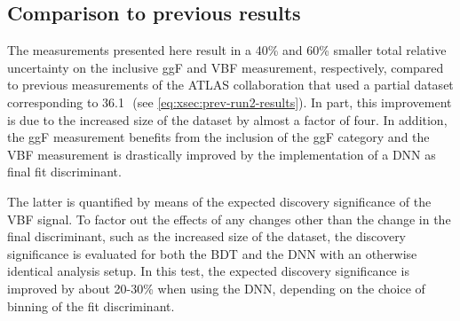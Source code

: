 \subsection{Comparison to previous results}
The measurements presented here result in a 40\% and 60\% smaller total relative uncertainty on the inclusive ggF and VBF measurement, respectively, compared to previous \RunTwo measurements of the ATLAS collaboration that used a partial \RunTwo dataset corresponding to 36.1\,\ifb\ (see \cref{eq:xsec:prev-run2-results}). 
In part, this improvement is due to the increased size of the dataset by almost a factor of four.
In addition, the ggF measurement benefits from the inclusion of the ggF \TwoJet category and the VBF measurement is drastically improved by the implementation of a DNN as final fit discriminant. 

The latter is quantified by means of the expected discovery significance of the VBF signal.
To factor out the effects of any changes other than the change in the final discriminant, such as the increased size of the dataset, the discovery significance is evaluated for both the BDT and the DNN with an otherwise identical analysis setup. In this test, the expected discovery significance is improved by about 20-30\% when using the DNN, depending on the choice of binning of the fit discriminant. 

